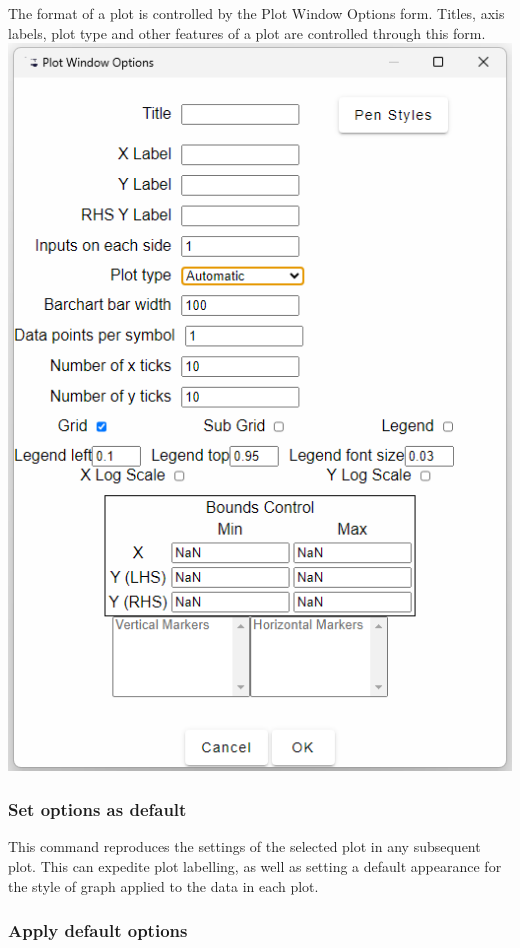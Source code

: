 The format of a plot is controlled by the Plot Window Options form.
Titles, axis labels, plot type and other features of a plot are controlled
through this form.
\includegraphics[height=0.9\textheight]{images/plotOptions}

\subsubsection{Set options as default}

This command reproduces the settings of the selected plot in any subsequent
plot. This can expedite plot labelling, as well as setting a default
appearance for the style of graph applied to the data in each plot.

\subsubsection{Apply default options}

